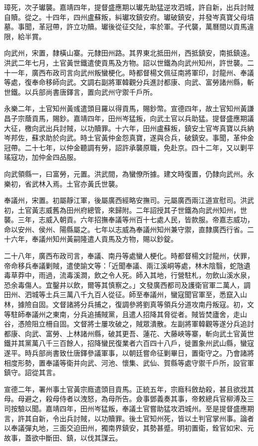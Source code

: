 \begin{pinyinscope}
璋死，次子瓛襲。嘉靖四年，提督盛應期以瓛先助猛逆攻泗城，許自新，出兵討賊自贖。從之。十四年，四州盧蘇叛，糾瓛攻鎮安府。瓛破鎮安，并發岑真寶父母墳墓。事聞，革冠帶，許立功贖。瓛後從征交阯，率於軍。子代襲，萬曆間以貢馬違限，給半賞。

向武州，宋置，隸橫山寨。元隸田州路。其界東北抵田州，西抵鎮安，南抵鎮遠。洪武二年七月，土官黃世鐵遣使貢馬及方物。詔以世鐵為向武州知州，許世襲。二十一年，廣西布政司言向武州叛蠻梗化。時都督楊文佩征南將軍印，討龍州、奉議等處，復奉命移師向武。文調右副將軍韓觀分兵進討都康、向武、富勞諸州縣，斬世鐵。以兵部尚書唐鐸言，置向武州守禦千戶所。

永樂二年，土官知州黃彧遣頭目羅以得貢馬，賜鈔幣。宣德四年，故土官知州黃謙昌子宗蔭貢馬，賜鈔。嘉靖四年，田州岑猛叛，向武土官以兵助猛。提督盛應期議大征，檄向武出兵討賊，以功贖罪。十六年，田州盧蘇叛，鎮安土官岑真寶以兵納岑邦佐，蘇求助於向武。時土官黃仲金怨真寶，遂與合兵，破鎮安。事聞，革仲金冠帶。二十七年，以仲金聽調有勞，詔許承襲原職，免赴京。四十二年，又以剿平瑤寇功，加仲金四品服。

向武領縣一，曰富勞，元置。洪武間，為蠻僚所據。建文時復置，仍隸向武州。永樂初，省武林入焉。土官亦黃氏世襲。

奉議州，宋置。初屬靜江軍，後屬廣西經略安撫司。元屬廣西兩江道宣慰司。洪武初，土官黃志威舊為田州府總管，來歸附。二年詔授其子世鐵為向武州知州，世襲。三年，志威入朝貢。六年招撫奉議等州百十七處人民，皆款服。帝嘉志威功，命以安州、侯州、陽縣屬之。七年以志威為奉議州知州兼守禦，直隸廣西行省。二十六年，奉議州知州黃嗣隆遣人貢馬及方物，賜以鈔錠。

二十八年，廣西布政司言，奉議、南丹等處蠻人梗化。時都督楊文討龍州，伏罪，帝命移兵奉議剿賊，遣使諭文等：「近聞奉議、兩江溪峒等處，林木陰翳，蛇虺遺毒草莽中，雨過，流毒溪澗，飲之令人死。師入其地，行營駐札，勿飲山溪水泉，恐余毒傷人。宜鑿井以飲，爾等其慎察之。」文發廣西都司及護衛官軍二萬人，調田州、泗城等土兵三萬八千九百人從征。師至奉議州，蠻寇聞官軍至，悉竄入山林，據險自固。文督諸將分兵捕之，復調參將劉真等領兵分道攻南丹叛寇。初，文等駐師奉議州之東南，分兵追捕賊黨，且遣人招降其脅從者。賊皆焚廬舍，走山谷，憑險阻立柵自固。文督將士屢攻破之，賊眾潰散。左副將軍韓觀等遂分兵追討都康、向武、富勞、上林諸州縣，破其更吾、蓮花、大藤峽等寨，斬向武土官黃世鐵并其黨萬八千三百餘人，招降蠻民復業者六百四十八戶，徙置象州武山縣，蠻寇遂平。時兵部尚書致仕唐鐸參議軍事，以朝廷嘗命征剿畢日，置衛守之。乃會諸將相度形勢，置奉議等衛并向武、河池、懷集、武仙、賀縣等處守禦千戶所，設官軍鎮守。詔從其言。

宣德二年，署州事土官黃宗廕遣頭目貢馬。正統五年，宗廕科斂劫殺，甚且欲戕其母。母避之，殺母侍者以洩怒，為母所告。僉事鄧義奏其事，帝敕總兵官柳溥及三司按驗以聞。嘉靖四年，田州岑猛叛，奉議土官嘗助猛攻泗城州。至是提督盛應期言，許其自新，令出兵討賊，以功贖罪。後土官知州死，皆以土判官掌州事。論者以奉議彈丸地，三面交迫田州，獨南界鎮安，其勢甚蹙。明初置衛，銓官如宋、元故事，蓋欲中斷田、鎮，以伐其謀云。


\end{pinyinscope}
